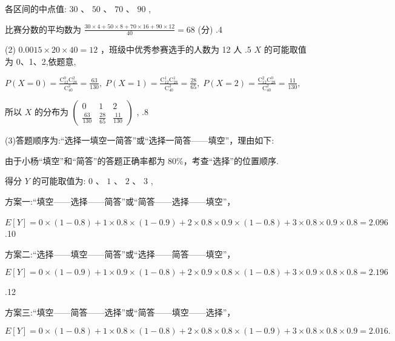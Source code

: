 \documentclass[10pt]{article}
\begin{document}
各区间的中点值: \({30}\text{ 、 }{50}\text{ 、 }{70}\text{ 、 }{90}\) ,

比赛分数的平均数为 \(\frac{{30} \times  4 + {50} \times  8 + {70} \times  {16} + {90} \times  {12}}{40} = {68}\) (分) .4

(2) \({0.0015} \times  {20} \times  {40} = {12}\) ，班级中优秀参赛选手的人数为 12 人 .5 \(X\) 的可能取值为 0、1、2,依题意,

\(P\left( {X = 0}\right)  = \frac{{\mathrm{C}}_{12}^{0}{\mathrm{C}}_{28}^{2}}{{\mathrm{C}}_{40}^{2}} = \frac{63}{130},\;P\left( {X = 1}\right)  = \frac{{\mathrm{C}}_{12}^{1}{\mathrm{C}}_{28}^{1}}{{\mathrm{C}}_{40}^{2}} = \frac{28}{65},\;P\left( {X = 2}\right)  = \frac{{\mathrm{C}}_{12}^{2}{\mathrm{C}}_{28}^{0}}{{\mathrm{C}}_{40}^{2}} = \frac{11}{130},\)

所以 \(X\) 的分布为 \(\left( \begin{matrix} 0 & 1 & 2 \\  \frac{63}{130} & \frac{28}{65} & \frac{11}{130} \end{matrix}\right)\) , .8

(3)答题顺序为:“选择一填空一简答”或“选择一简答——填空”，理由如下:

由于小杨“填空”和“简答”的答题正确率都为 80\%，考查“选择”的位置顺序.

得分 \(Y\) 的可能取值为: \(0\text{ 、 }1\text{ 、 }2\text{ 、 }3\) ,

方案一:“填空——选择——简答”或“简答——选择——填空”，

\(E\left\lbrack  Y\right\rbrack   = 0 \times  \left( {1 - {0.8}}\right)  + 1 \times  {0.8} \times  \left( {1 - {0.9}}\right)  + 2 \times  {0.8} \times  {0.9} \times  \left( {1 - {0.8}}\right)  + 3 \times  {0.8} \times  {0.9} \times  {0.8} = {2.096}\) .10

方案二:“选择——填空——简答”或“选择——简答——填空”，

\[
E\left\lbrack  Y\right\rbrack   = 0 \times  \left( {1 - {0.9}}\right)  + 1 \times  {0.9} \times  \left( {1 - {0.8}}\right)  + 2 \times  {0.9} \times  {0.8} \times  \left( {1 - {0.8}}\right)  + 3 \times  {0.9} \times  {0.8} \times  {0.8} = {2.196}
\]

.12

方案三:“填空——简答——选择”或“简答——填空——选择”，

\[
E\left\lbrack  Y\right\rbrack   = 0 \times  \left( {1 - {0.8}}\right)  + 1 \times  {0.8} \times  \left( {1 - {0.8}}\right)  + 2 \times  {0.8} \times  {0.8} \times  \left( {1 - {0.9}}\right)  + 3 \times  {0.8} \times  {0.8} \times  {0.9} = {2.016}.
\]
\end{document}
